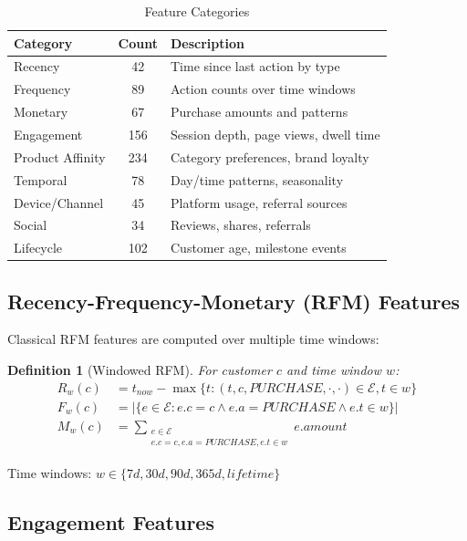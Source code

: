 \documentclass[11pt,a4paper]{article}
\newtheorem{definition}[theorem]{Definition}
\begin{document}
\begin{table}[h]
\centering
\caption{Feature Categories}
\begin{tabular}{lcp{6cm}}
\toprule
\textbf{Category} & \textbf{Count} & \textbf{Description} \\
\midrule
Recency & 42 & Time since last action by type \\
Frequency & 89 & Action counts over time windows \\
Monetary & 67 & Purchase amounts and patterns \\
Engagement & 156 & Session depth, page views, dwell time \\
Product Affinity & 234 & Category preferences, brand loyalty \\
Temporal & 78 & Day/time patterns, seasonality \\
Device/Channel & 45 & Platform usage, referral sources \\
Social & 34 & Reviews, shares, referrals \\
Lifecycle & 102 & Customer age, milestone events \\
\bottomrule
\end{tabular}
\end{table}

\subsection{Recency-Frequency-Monetary (RFM) Features}

Classical RFM features are computed over multiple time windows:

\begin{definition}[Windowed RFM]
For customer $c$ and time window $w$:
\begin{align}
R_w(c) &= t_{now} - \max\{t : (t, c, PURCHASE, \cdot, \cdot) \in \mathcal{E}, t \in w\} \\
F_w(c) &= |\{e \in \mathcal{E} : e.c = c \land e.a = PURCHASE \land e.t \in w\}| \\
M_w(c) &= \sum_{\substack{e \in \mathcal{E} \\ e.c = c, e.a = PURCHASE, e.t \in w}} e.amount
\end{align}
\end{definition}

Time windows: $w \in \{7d, 30d, 90d, 365d, lifetime\}$

\subsection{Engagement Features}
\end{document}
